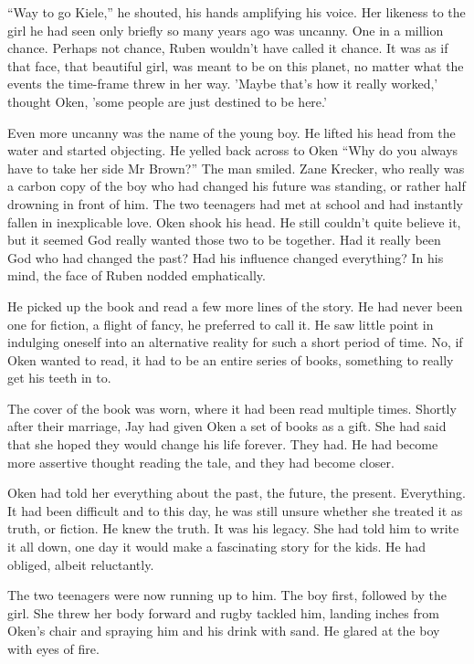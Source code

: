 ``Way to go Kiele,'' he shouted, his hands amplifying his voice.  Her likeness to the girl he had seen only briefly so many years ago was uncanny.  One in a million chance.  Perhaps not chance, Ruben wouldn't have called it chance.  It was as if that face, that beautiful girl, was meant to be on this planet, no matter what the events the time-frame threw in her way.  'Maybe that's how it really worked,' thought Oken, 'some people are just destined to be here.'  

Even more uncanny was the name of the young boy.  He lifted his head from the water and started objecting.  He yelled back across to Oken ``Why do you always have to take her side Mr Brown?''  The man smiled.  Zane Krecker, who really was a carbon copy of the boy who had changed his future was standing, or rather half drowning in front of him.  The two teenagers had met at school and had instantly fallen in inexplicable love.  Oken shook his head.  He still couldn't quite believe it, but it seemed God really wanted those two to be together.  Had it really been God who had changed the past?  Had his influence changed everything?  In his mind, the face of Ruben nodded emphatically.

He picked up the book and read a few more lines of the story.  He had never been one for fiction, a flight of fancy, he preferred to call it.  He saw little point in indulging oneself into an alternative reality for such a short period of time.  No, if Oken wanted to read, it had to be an entire series of books, something to really get his teeth in to.

The cover of the book was worn, where it had been read multiple times.  Shortly after their marriage, Jay had given Oken a set of books as a gift.  She had said that she hoped they would change his life forever.  They had.  He had become more assertive thought reading the tale, and they had become closer.  

Oken had told her everything about the past, the future, the present.  Everything.  It had been difficult and to this day, he was still unsure whether she treated it as truth, or fiction.  He knew the truth.  It was his legacy.  She had told him to write it all down, one day it would make a fascinating story for the kids.  He had obliged, albeit reluctantly.  

The two teenagers were now running up to him.  The boy first, followed by the girl.  She threw her body forward and rugby tackled him, landing inches from Oken's chair and spraying him and his drink with sand.  He glared at the boy with eyes of fire.

